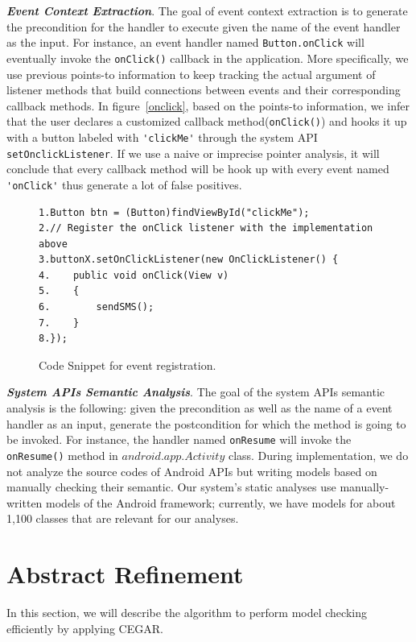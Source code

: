 \documentclass{article}
\begin{document}
{\bf \emph{Event Context Extraction}}. 
The goal of event context extraction is to generate the precondition for the handler to execute given the name of the event handler as the input. For instance, an event handler named \verb+Button.onClick+ will eventually invoke the \verb+onClick()+ callback in the application. More specifically, we use previous points-to information to keep tracking the actual argument of listener methods that build connections between events and their corresponding callback methods. In figure~\ref{onclick}, based on the points-to information, we infer that   
the user declares a customized callback method(\verb+onClick()+) and hooks it up with a button labeled with \verb+'clickMe'+ through the system API \verb+setOnclickListener+. If we use a naive or imprecise pointer analysis, it will conclude that every callback method will be hook up with every event named \verb+'onClick'+ thus generate a lot of false positives. 
\begin{figure}[!t]
\begin{center}
{ 
\begin{verbatim}
1.Button btn = (Button)findViewById("clickMe");
2.// Register the onClick listener with the implementation above
3.buttonX.setOnClickListener(new OnClickListener() {
4.    public void onClick(View v)
5.    {
6.        sendSMS();
7.    } 
8.});
\end{verbatim}
}
\end{center}
\caption{Code Snippet for event registration.}
\label{fig:onclick}
\end{figure}


{\bf \emph{System APIs Semantic Analysis}}. 
The goal of the system APIs semantic analysis is the following: given the precondition as well as the name of a event handler as an input, generate the postcondition for which the method is going to be invoked. For instance, the handler named \verb+onResume+ will invoke the \verb+onResume()+ method in $android.app.Activity$ class. 
During implementation, we do not analyze the source codes of Android APIs but writing models based on manually checking their semantic. Our system's static analyses use manually-written models of the Android framework; currently, we have models for about
1,100 classes that are relevant for our analyses.


\section{Abstract Refinement}
\label{sec:cegar}
In this section, we will describe the algorithm to perform model checking efficiently
by applying CEGAR.
\end{document}
